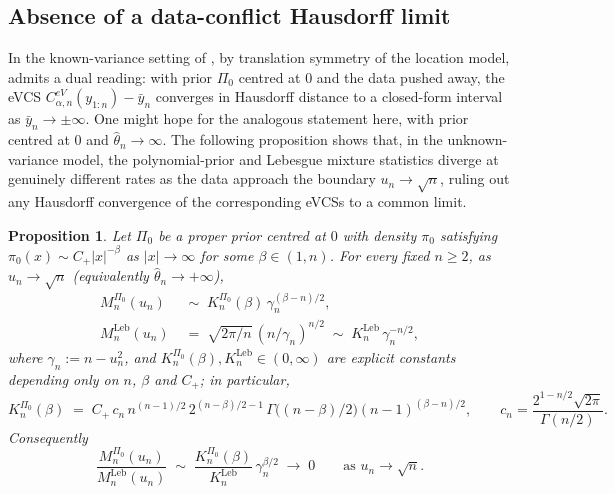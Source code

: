 \documentclass{article}%
\newtheorem{proposition}[theorem]{Proposition}
\newcommand{\Leb}{\mathrm{Leb}}
\begin{document}
\subsection{Absence of a data-conflict Hausdorff limit}\label{sec:no-data-conflict}

In the known-variance setting of \cite{Cortinovis2025}, by
translation symmetry of the location model,
\cite[Theorem~4.4]{Cortinovis2025} admits a dual reading: with prior
\(\Pi_0\) centred at \(0\) and the data pushed away, the eVCS
\(C^{eV}_{\alpha,n}(y_{1:n})-\bar y_n\) converges in Hausdorff
distance to a closed-form interval as \(\bar y_n\to\pm\infty\). One
might hope for the analogous statement here, with prior centred at
\(0\) and \(\widehat\theta_n\to\infty\). The following proposition
shows that, in the unknown-variance model, the polynomial-prior and
Lebesgue mixture statistics diverge at genuinely different rates as
the data approach the boundary \(u_n\to\sqrt n\), ruling out any
Hausdorff convergence of the corresponding eVCSs to a common limit.

\begin{proposition}\label{prop:rate-mismatch}
Let \(\Pi_0\) be a proper prior centred at \(0\) with density
\(\pi_0\) satisfying
\(\pi_0(x)\sim C_+|x|^{-\beta}\) as \(|x|\to\infty\)
for some \(\beta\in(1,n)\). For every fixed \(n\geq 2\), as
\(u_n\to\sqrt n\) (equivalently \(\widehat\theta_n\to+\infty\)),
\begin{align}
   M_n^{\Pi_0}(u_n) &\;\sim\;
       K_n^{\Pi_0}(\beta)\,\gamma_n^{(\beta-n)/2},
       \label{eq:Mn-rate}\\[2pt]
   M_n^{\Leb}(u_n) &\;=\;
       \sqrt{2\pi/n}\,(n/\gamma_n)^{n/2}
       \;\sim\;K_n^{\Leb}\,\gamma_n^{-n/2},
       \label{eq:Mleb-rate}
\end{align}
where \(\gamma_n:=n-u_n^2\), and
\(K_n^{\Pi_0}(\beta), K_n^{\Leb}\in(0,\infty)\) are explicit
constants depending only on \(n\), \(\beta\) and \(C_+\); in
particular,
\[
  K_n^{\Pi_0}(\beta)
  \;=\; C_+\,c_n\,n^{(n-1)/2}\,
        2^{(n-\beta)/2-1}\,\Gamma\!\bigl((n-\beta)/2\bigr)
        (n-1)^{(\beta-n)/2},
  \qquad c_n=\frac{2^{1-n/2}\sqrt{2\pi}}{\Gamma(n/2)}.
\]
Consequently
\begin{equation}\label{eq:rate-mismatch}
   \frac{M_n^{\Pi_0}(u_n)}{M_n^{\Leb}(u_n)}
   \;\sim\;\frac{K_n^{\Pi_0}(\beta)}{K_n^{\Leb}}\,\gamma_n^{\beta/2}
   \;\longrightarrow\;0\qquad\text{as }u_n\to\sqrt n.
\end{equation}
\end{proposition}
\end{document}
